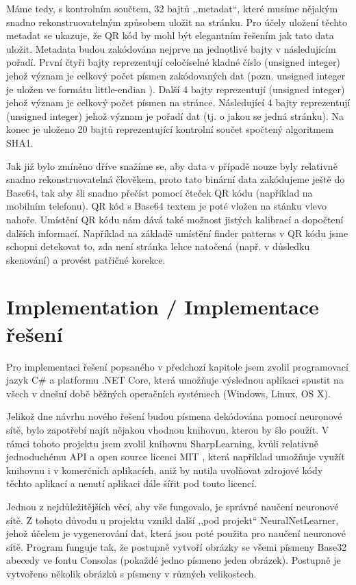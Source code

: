 \documentclass[conference]{IEEEtran}
\begin{document}
Máme tedy, s kontrolním součtem, 32 bajtů ,,metadat``, které musíme nějakým snadno rekonstruovatelným způsobem uložit na stránku. Pro účely uložení těchto metadat se ukazuje, že QR kód by mohl být elegantním řešením jak tato data uložit. Metadata budou zakódována nejprve na jednotlivé bajty v následujícím pořadí. První čtyři bajty reprezentují celočíselné kladné číslo (unsigned integer) jehož význam je celkový počet písmen zakódovaných dat (pozn. unsigned integer je uložen ve formátu little-endian \cite{IEN137:LittleEndian}). Další 4 bajty reprezentují (unsigned integer) jehož význam je celkový počet písmen na stránce. Následující 4 bajty reprezentují (unsigned integer) jehož význam je pořadí dat (tj. o jakou se jedná stránku). Na konec je uloženo 20 bajtů reprezentující kontrolní součet spočtený algoritmem SHA1. 

Jak již bylo zmíněno dříve snažíme se, aby data v případě nouze byly relativně snadno rekonstruovatelná člověkem, proto tato binární data zakódujeme ještě do Base64, tak aby šli snadno přečíst pomocí čteček QR kódu (například na mobilním telefonu). QR kód s Base64 textem je poté vložen na stánku vlevo nahoře. Umístění QR kódu nám dává také možnost jistých kalibrací a dopočtení dalších informací. Například na základě umístění finder patterns v QR kódu jsme schopni detekovat to, zda není stránka lehce natočená (např. v důsledku skenování) a provést patřičné korekce.

\section{Implementation / Implementace řešení}

Pro implementaci řešení popsaného v předchozí kapitole jsem zvolil programovací jazyk C\# a platformu .NET Core, která umožňuje výslednou aplikaci spustit na všech v dnešní době běžných operačních systémech (Windows, Linux, OS X).

Jelikož dne návrhu nového řešení budou písmena dekódována pomocí neuronové sítě, bylo zapotřebí najít nějakou vhodnou knihovnu, kterou by šlo použít. V rámci tohoto projektu jsem zvolil knihovnu SharpLearning, kvůli relativně jednoduchému API a open source licenci MIT \cite{MITLicense}, která například umožňuje využít knihovnu i v komerčních aplikacích, aniž by nutila uvolňovat zdrojové kódy těchto aplikací a nenutí aplikaci dále šířit pod touto licencí.

Jednou z nejdůležitějších věcí, aby vše fungovalo, je správné naučení neuronové sítě. Z tohoto důvodu u projektu vznikl další ,,pod projekt`` NeuralNetLearner, jehož účelem je vygenerování dat, která jsou poté použita pro naučení neuronové sítě. Program funguje tak, že postupně vytvoří obrázky se všemi písmeny Base32 abecedy ve fontu Consolas (pokaždé jedno písmeno jeden obrázek). Postupně je vytvořeno několik obrázků s písmeny v různých velikostech. 
\end{document}
